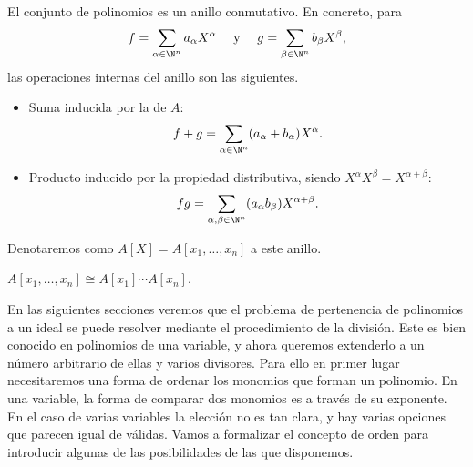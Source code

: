 \begin{proposicion}
    El conjunto de polinomios es un anillo conmutativo. En concreto, para
     $$ f = \sum_{\alpha\in \N^n} a_{\alpha} X^{\alpha}\quad \text{ y }\quad g = \sum_{\beta\in \N^n} b_{\beta} X^{\beta},$$ 
     las operaciones internas del anillo son las siguientes.
    \begin{itemize}
        \item Suma inducida por la de $A$: 
        $$f+g = \sum_{\alpha\in \N^n}(a_{\alpha} + b_{\alpha})X^{\alpha}.$$
        \item Producto inducido por la propiedad distributiva, siendo $X^{\alpha}X^{\beta} = X^{\alpha+\beta}$: 
        $$fg = \sum_{\alpha,\beta \in \N^n} (a_{\alpha}b_{\beta})X^{\alpha+\beta}.$$
    \end{itemize}
    Denotaremos como  $A[X] = A[x_1,\dots, x_n]$ a este anillo.
\end{proposicion}
\begin{proposicion}
    $A[x_1,\dots, x_n] \cong A[x_1]\cdots A[x_n]$.
\end{proposicion}

En las siguientes secciones veremos que el problema de pertenencia de polinomios a un ideal se puede resolver mediante el procedimiento de la división. Este es bien conocido en polinomios de una variable, y ahora queremos extenderlo a un número arbitrario de ellas y varios divisores. Para ello en primer lugar necesitaremos una forma de ordenar los monomios que forman un polinomio. En una variable, la forma  de comparar dos monomios es a través de su exponente. En el caso de varias variables la elección no es tan clara, y hay varias opciones que parecen igual de válidas. Vamos a formalizar el concepto de orden para introducir algunas de las posibilidades de las que disponemos. 

